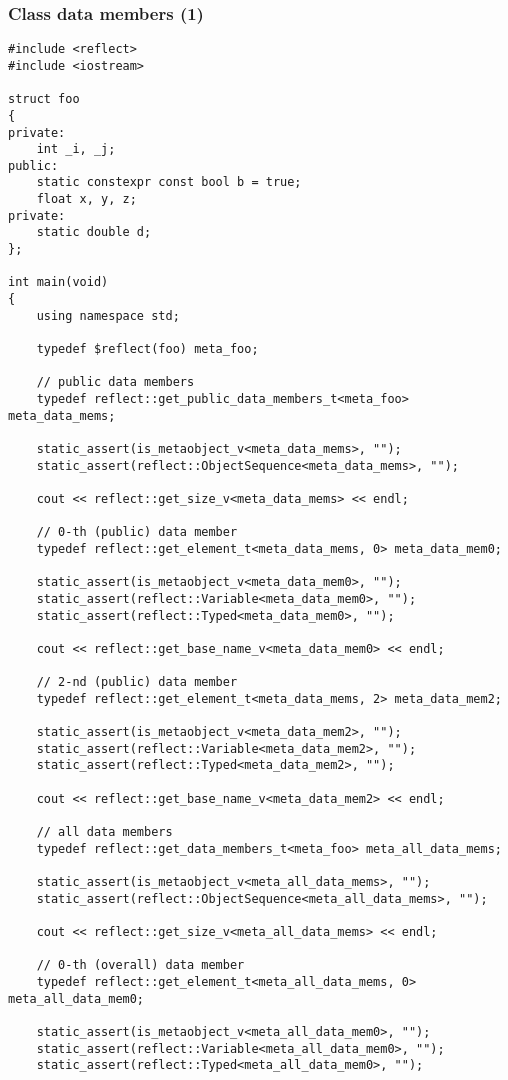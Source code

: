 \subsubsection{Class data members (1)}

\begin{verbatim}
#include <reflect>
#include <iostream>

struct foo
{
private:
	int _i, _j;
public:
	static constexpr const bool b = true;
	float x, y, z;
private:
	static double d;
};

int main(void)
{
	using namespace std;

	typedef $reflect(foo) meta_foo;

	// public data members
	typedef reflect::get_public_data_members_t<meta_foo> meta_data_mems;

	static_assert(is_metaobject_v<meta_data_mems>, "");
	static_assert(reflect::ObjectSequence<meta_data_mems>, "");

	cout << reflect::get_size_v<meta_data_mems> << endl;

	// 0-th (public) data member
	typedef reflect::get_element_t<meta_data_mems, 0> meta_data_mem0;

	static_assert(is_metaobject_v<meta_data_mem0>, "");
	static_assert(reflect::Variable<meta_data_mem0>, "");
	static_assert(reflect::Typed<meta_data_mem0>, "");

	cout << reflect::get_base_name_v<meta_data_mem0> << endl;

	// 2-nd (public) data member
	typedef reflect::get_element_t<meta_data_mems, 2> meta_data_mem2;

	static_assert(is_metaobject_v<meta_data_mem2>, "");
	static_assert(reflect::Variable<meta_data_mem2>, "");
	static_assert(reflect::Typed<meta_data_mem2>, "");

	cout << reflect::get_base_name_v<meta_data_mem2> << endl;

	// all data members
	typedef reflect::get_data_members_t<meta_foo> meta_all_data_mems;

	static_assert(is_metaobject_v<meta_all_data_mems>, "");
	static_assert(reflect::ObjectSequence<meta_all_data_mems>, "");

	cout << reflect::get_size_v<meta_all_data_mems> << endl;

	// 0-th (overall) data member
	typedef reflect::get_element_t<meta_all_data_mems, 0> meta_all_data_mem0;

	static_assert(is_metaobject_v<meta_all_data_mem0>, "");
	static_assert(reflect::Variable<meta_all_data_mem0>, "");
	static_assert(reflect::Typed<meta_all_data_mem0>, "");


\end{verbatim}
